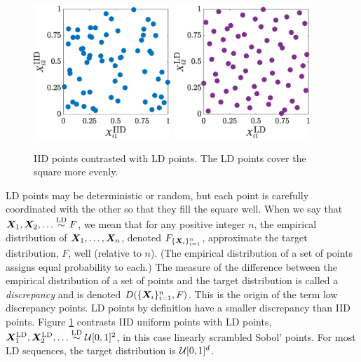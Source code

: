\documentclass[graybox,footinfo]{svmult}
\newcommand{\LD}{\textup{LD}}
\newcommand{\LDsim}{\overset{\LD}{\sim}}
\begin{document}
\begin{figure}
	\includegraphics[height=5cm]{ProgramsImages/IIDPoints.eps} \qquad
	\includegraphics[height=5cm]{ProgramsImages/SSobolPoints.eps}
	\caption{IID points contrasted with LD points.  The LD points cover the square more evenly.} \label{fig:comparePts}
\end{figure}

LD points may be deterministic or random, but each point is carefully coordinated with the other so that they fill the square well.  When we say that $\bsX_1, \bsX_2, \ldots \LDsim F$, we mean that for any positive integer $n$,  the empirical distribution of ${\boldsymbol{X}}_1, \ldots, {\boldsymbol{X}}_n$, denoted $F_{\{{\boldsymbol{X}}_i\}_{i=1}^n}$,  approximate the target distribution, $F$, well (relative to $n$).  (The empirical distribution of a set of points assigns equal probability to each.)  The measure of the difference between the empirical distribution of a set of points and the target distribution is called a \emph{discrepancy} and is denoted $D(\{{\boldsymbol{X}}_i\}_{i=1}^n, F)$.  This is the origin of the term low discrepancy points.  LD points by definition have a smaller discrepancy than IID points.  Figure \ref{fig:comparePts} contrasts IID uniform points with LD points, $\bsX^{\LD}_1, \bsX^{\LD}_2, \ldots \LDsim \calU[0,1]^2$, in this case linearly scrambled Sobol' points. For most LD sequences, the target distribution is ${\mathcal{U}}[0,1]^d$.
\end{document}
